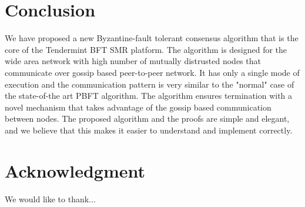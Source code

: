 \section{Conclusion} \label{sec:conclusion}

We have proposed a new Byzantine-fault tolerant consensus algorithm that is the
core of the Tendermint BFT SMR platform. The algorithm is designed for the wide
area network with high number of mutually distrusted nodes that communicate
over gossip based peer-to-peer network. It has only a single mode of execution
and the communication pattern is very similar to the "normal" case of the
state-of-the art PBFT algorithm. The algorithm ensures termination with a novel
mechanism that takes advantage of the gossip based communication between nodes.
The proposed algorithm and the proofs are simple and elegant, and we believe
that this makes it easier to understand and implement correctly.   

\section*{Acknowledgment}

We would like to thank...

